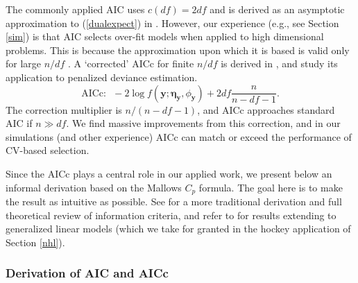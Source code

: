 \documentclass[12pt]{article}
\newcommand{\bs}[1]{\boldsymbol{#1}}
\newcommand{\bm}[1]{\mathbf{#1}}
\begin{document}
The commonly applied AIC uses $c(df)=2df$ and is derived as an asymptotic approximation to (\ref{dualexpect}) in 
\cite{akaike_information_1973}.  However, our experience (e.g., see Section
\ref{sim}) is that AIC selects over-fit models when applied to high dimensional
problems.  This is because the approximation upon which it is based
is valid only for large $n/df$ \citep{burnham_model_2002}.  A `corrected' AICc
for finite $n/df$ is derived in
\cite{hurvich_regression_1989}, and \citet{flynn_efficiency_2013} study its
application to penalized deviance estimation.
\begin{equation}
\text{AICc:}~~~-2\log f(\bm{y}; \bs{\eta}_{\bm{y}},\phi_{\bm{y}}) + 2df\frac{n}{n-df-1}.
\end{equation}
The correction multiplier is $n/(n-df-1)$, and AICc approaches standard AIC if $n\gg df$.  We find massive improvements from this correction, and in our simulations (and other experience) AICc can match or exceed the  performance of CV-based selection.  

Since the AICc plays a central role in our applied work, we present below an informal derivation based on the Mallows $C_p$ formula.  The goal here is to make the result as intuitive as possible.  See \cite{claeskens_model_2008} for a more traditional derivation and full theoretical review of information criteria, and refer to \citet{flynn_efficiency_2013} for results extending to generalized linear models (which we take for granted in the hockey application of Section \ref{nhl}). 

\subsubsection{Derivation of AIC and AICc}
\end{document}
